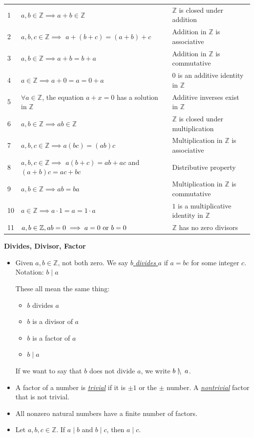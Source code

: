 \documentclass[11pt]{article}
\newcommand\tn{\textnormal}
\newcommand{\Z}{\mathbb{Z}}
\newcommand\divides{\;|\;}
\newcommand\notdivides{\;|\hspace{-2pt}\backslash\hspace{2pt}\;}
\theoremstyle{definition}
\begin{document}
\begin{tabular}{C{0.2in}|L{3.5in}|L{2.25in}}
1 & $a,b \in \Z \implies a+b\in \Z$ &  $\Z$ is closed under addition \\ 
2 & $a,b,c\in \Z\implies$ $a+(b+c)=(a+b)+c$ & Addition in $\Z$ is associative \\
3 & $a,b \in \Z \implies a+b=b+a$&  Addition in $\Z$ is commutative \\ 
4 & $a\in \Z \implies a+0=a=0+a$ & $0$ is an additive identity in $\Z$ \\ 
5 & $\forall a\in \Z$, the equation $a+x=0$ has a solution in $\Z$ & Additive inverses exist in $\Z$ \\ 
6 & $a,b\in\Z \implies ab\in \Z$ & $\Z$ is closed under multiplication \\ 
7 & $a,b,c\in \Z \implies a(bc)=(ab)c$ & Multiplication in $\Z$ is associative \\ 
8 & $a,b,c\in \Z\implies$  $a(b+c)=ab+ac$ and $(a+b)c=ac+bc$& Distributive property \\
9 & $a,b\in \Z\implies ab=ba$ & Multiplication in $\Z$ is commutative \\  
10 &$a\in\Z\implies a\cdot 1=a=1\cdot a$ & $1$ is a multiplicative identity in $\Z$ \\ 
11 & $a,b\in \Z, ab=0 \implies a=0 \tn { or } b=0$ & $\Z$ has no zero divisors
\end{tabular} 

\vspace*{4pt}
{\bf Divides, Divisor, Factor} 

\vspace*{-8pt}
\begin{itemize}
\item  Given $a, b\in \Z$, not both zero. We say \underline{$b$ {\it divides} $a$}  if $a=bc$ for some integer $c$.   Notation: $b\divides a$
		 
		 These all mean the same thing:
		\begin{itemize}[label={$\circ$}]
		\item $b$ divides $a$
		\item $b$ is a divisor of $a$
		\item $b$ is a factor of $a$
		\item $b\divides a$
		\end{itemize}
		
		 If we want to say that $b$ does not divide $a$, we write $b\notdivides a$.

\item A factor of a number is \underline {\it trivial} if it is $\pm 1$ or the $\pm$ number.  A \underline{\it nontrivial} factor that is not trivial.

\item All nonzero natural numbers have a finite number of factors.

\item Let $a,b,c\in \Z$. If $a\divides b$ and $b\divides c$, then $a\divides c$.
\end{itemize}
\end{document}
